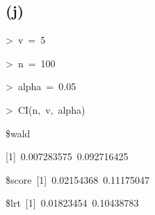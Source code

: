 \subsection*{(j)}
\begin{lyxcode}
>~v~=~5~

>~n~=~100~

>~alpha~=~0.05~

>~CI(n,~v,~alpha)~

\$wald~

{[}1{]}~0.007283575~0.092716425~

\$score~{[}1{]}~0.02154368~0.11175047~

\$lrt~{[}1{]}~0.01823454~0.10438783
\end{lyxcode}
